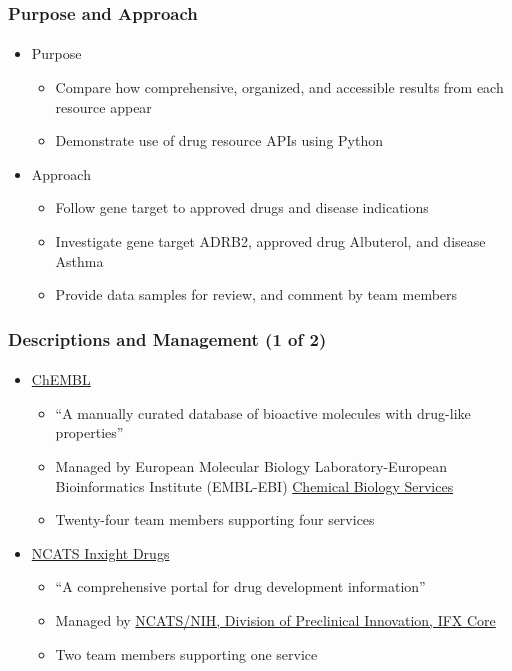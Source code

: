 \documentclass[aspectratio=169,xcolor=dvipsnames]{beamer}
\begin{document}
\begin{frame}
  \frametitle{Purpose and Approach}
  \framesubtitle{}
  \begin{itemize}
  \item[] Purpose
    \begin{itemize}
    \item Compare how comprehensive, organized, and accessible results
      from each resource appear
    \item Demonstrate use of drug resource APIs using Python
    \end{itemize}
    \vspace{0.5\baselineskip}
  \item[] Approach
    \begin{itemize}
    \item Follow gene target to approved drugs and disease indications
    \item Investigate gene target ADRB2, approved drug Albuterol, and
      disease Asthma
    \item Provide data samples for review, and comment by team members
    \end{itemize}
  \end{itemize}
\end{frame}

\begin{frame}
  \frametitle{Descriptions and Management (1 of 2)}
  \framesubtitle{}
  \begin{itemize}
  \item[] \href{https://www.ebi.ac.uk/chembl/}{ChEMBL}
    \begin{itemize}
    \item ``A manually curated database of bioactive molecules with
      drug-like properties''
    \item Managed by European Molecular Biology Laboratory-European
      Bioinformatics Institute (EMBL-EBI)
      \href{https://www.ebi.ac.uk/about/teams/chemical-biology-services/}{Chemical
        Biology Services}
    \item Twenty-four team members supporting four services
    \end{itemize}
    \vspace{0.5\baselineskip}
  \item[] \href{https://drugs.ncats.io/}{NCATS Inxight Drugs}
    \begin{itemize}
    \item ``A comprehensive portal for drug development information''
    \item Managed by \href{https://drugs.ncats.io/about}{NCATS/NIH,
      Division of Preclinical Innovation, IFX Core}
    \item Two team members supporting one service
    \end{itemize}
  \end{itemize}
\end{frame}
\end{document}
